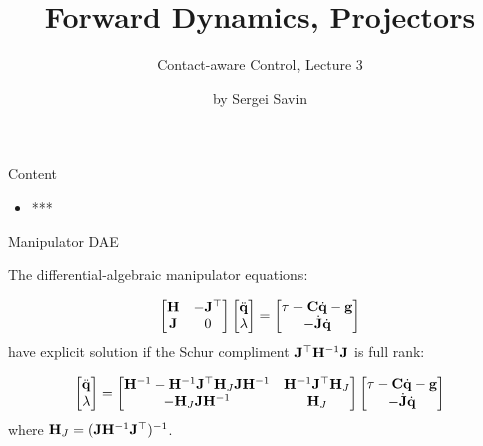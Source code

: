 \documentclass{beamer}
\title{Forward Dynamics, Projectors}
\subtitle{Contact-aware Control, Lecture 3}
\author{by Sergei Savin}
\date{\mydate}
\begin{document}
\maketitle


\begin{frame}{Content}

\begin{itemize}
\item ***
\end{itemize}

\end{frame}




\begin{frame}{Manipulator DAE}
	\begin{flushleft}
		
		The differential-algebraic manipulator equations:
		
		\begin{equation}
			\begin{bmatrix}
				\mathbf{H} & -\mathbf{J}^\top \\
				\mathbf{J} & 0
			\end{bmatrix}
			\begin{bmatrix}
				\ddot{\mathbf{q}} \\
				\lambda
			\end{bmatrix}
			=
			\begin{bmatrix}
				\tau - \mathbf{C} \dot{\mathbf{q}} - \mathbf{g} \\
				-\dot{\mathbf{J}} \dot{\mathbf{q}}
			\end{bmatrix}
		\end{equation}
		have explicit solution if the Schur compliment $\mathbf{J}^\top \mathbf{H}^{-1}\mathbf{J}$ is full rank:
		
		\begin{equation}
			\begin{bmatrix}
				\ddot{\mathbf{q}} \\
				\lambda
			\end{bmatrix}
		=
		\begin{bmatrix}
			\mathbf{H}^{-1}-\mathbf{H}^{-1} \mathbf{J}^\top \mathbf{H}_J \mathbf{J} \mathbf{H}^{-1} &
			 \mathbf{H}^{-1} \mathbf{J}^\top \mathbf{H}_J \\
			-\mathbf{H}_J \mathbf{J} \mathbf{H}^{-1} & \mathbf{H}_J
		\end{bmatrix}
			\begin{bmatrix}
				\tau - \mathbf{C} \dot{\mathbf{q}} - \mathbf{g} \\
				-\dot{\mathbf{J}} \dot{\mathbf{q}}
			\end{bmatrix}
		\end{equation}
		where $\mathbf{H}_J = ( \mathbf{J} \mathbf{H}^{-1} \mathbf{J}^\top )^{-1}$.
				
	\end{flushleft}
\end{frame}
\end{document}
